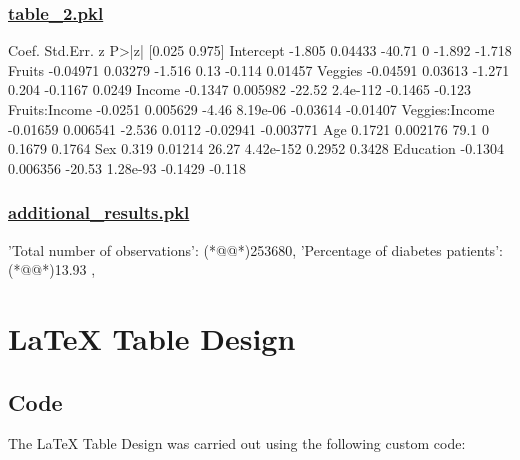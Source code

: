 \documentclass[11pt]{article}
\begin{document}
\subsubsection*{\hyperlink{code-Data Analysis-table-2-pkl}{table\_2.pkl}}

\begin{codeoutput}
                  Coef. Std.Err.      z      P>|z|   [0.025    0.975]
Intercept        -1.805  0.04433 -40.71          0   -1.892    -1.718
Fruits         -0.04971  0.03279 -1.516       0.13   -0.114   0.01457
Veggies        -0.04591  0.03613 -1.271      0.204  -0.1167    0.0249
Income          -0.1347 0.005982 -22.52   2.4e-112  -0.1465    -0.123
Fruits:Income   -0.0251 0.005629  -4.46   8.19e-06 -0.03614  -0.01407
Veggies:Income -0.01659 0.006541 -2.536     0.0112 -0.02941 -0.003771
Age              0.1721 0.002176   79.1          0   0.1679    0.1764
Sex               0.319  0.01214  26.27  4.42e-152   0.2952    0.3428
Education       -0.1304 0.006356 -20.53   1.28e-93  -0.1429    -0.118
\end{codeoutput}\hypertarget{file-additional-results-pkl}{}

\subsubsection*{\hyperlink{code-Data Analysis-additional-results-pkl}{additional\_results.pkl}}

\begin{codeoutput}
{
    'Total number of observations': (*@@*)253680,
    'Percentage of diabetes patients': (*@@*)13.93             ,
}
\end{codeoutput}

\section{LaTeX Table Design}
\subsection{{Code}}
The LaTeX Table Design was carried out using the following custom code:
\end{document}
